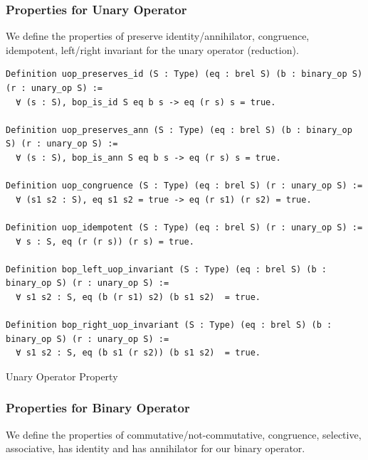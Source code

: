 \documentclass[a4paper,12pt,twoside,openright]{report}
\begin{document}
\subsubsection{Properties for Unary Operator}
We define the properties of preserve identity/annihilator, congruence, idempotent, left/right invariant for the unary operator (reduction).

\begin{listing}[H]
\begin{verbatim}
Definition uop_preserves_id (S : Type) (eq : brel S) (b : binary_op S) (r : unary_op S) :=
  ∀ (s : S), bop_is_id S eq b s -> eq (r s) s = true.
  
Definition uop_preserves_ann (S : Type) (eq : brel S) (b : binary_op S) (r : unary_op S) :=
  ∀ (s : S), bop_is_ann S eq b s -> eq (r s) s = true.

Definition uop_congruence (S : Type) (eq : brel S) (r : unary_op S) := 
  ∀ (s1 s2 : S), eq s1 s2 = true -> eq (r s1) (r s2) = true. 

Definition uop_idempotent (S : Type) (eq : brel S) (r : unary_op S) := 
  ∀ s : S, eq (r (r s)) (r s) = true.
  
Definition bop_left_uop_invariant (S : Type) (eq : brel S) (b : binary_op S) (r : unary_op S) :=
  ∀ s1 s2 : S, eq (b (r s1) s2) (b s1 s2)  = true.

Definition bop_right_uop_invariant (S : Type) (eq : brel S) (b : binary_op S) (r : unary_op S) :=
  ∀ s1 s2 : S, eq (b s1 (r s2)) (b s1 s2)  = true.
\end{verbatim}
\caption{Unary Operator Property} 
\label{coq:def:uop_properties}
\end{listing}

\subsubsection{Properties for Binary Operator}
We define the properties of commutative/not-commutative, congruence, selective, associative, has identity and has annihilator for our binary operator.
\end{document}
